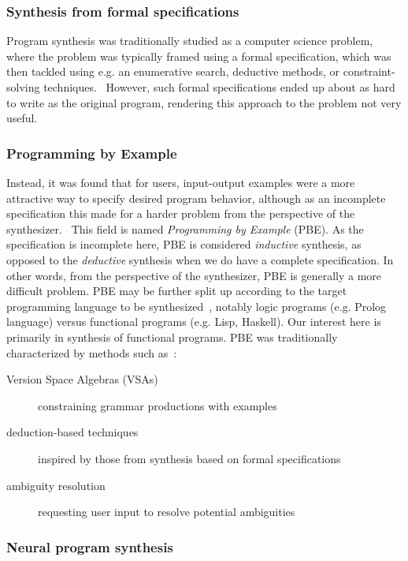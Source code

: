 \documentclass{article}
\begin{document}
\subsubsection{Synthesis from formal specifications}

Program synthesis was traditionally studied as a computer science problem,
where the problem was typically framed using a formal specification,
which was then tackled using e.g. an enumerative search, deductive methods, or constraint-solving techniques.~\citep{gulwani2017program}
However, such formal specifications ended up about as hard to write as the original program,
rendering this approach to the problem not very useful.

\subsubsection{Programming by Example}

Instead, it was found that for users, input-output examples were a more attractive way to specify desired program behavior,
although as an incomplete specification this made for a harder problem from the perspective of the synthesizer.~\citep{bodik2013algorithmic}
This field is named \emph{Programming by Example} (PBE).
As the specification is incomplete here, PBE is considered \emph{inductive} synthesis, as opposed to the \emph{deductive} synthesis when we do have a complete specification.
In other words, from the perspective of the synthesizer, PBE is generally a more difficult problem.
PBE may be further split up according to the target programming language to be synthesized~\citep{bodik2013algorithmic},
notably logic programs (e.g. Prolog language) versus functional programs (e.g. Lisp, Haskell).
Our interest here is primarily in synthesis of functional programs.
PBE was traditionally characterized by methods such as~\citep{gulwani2017program}:
\begin{description}
    \item[Version Space Algebras (VSAs)]
        constraining grammar productions with examples
    \item[deduction-based techniques]
        inspired by those from synthesis based on formal specifications
    \item[ambiguity resolution]
        requesting user input to resolve potential ambiguities
\end{description}

\subsubsection{Neural program synthesis}
\end{document}
